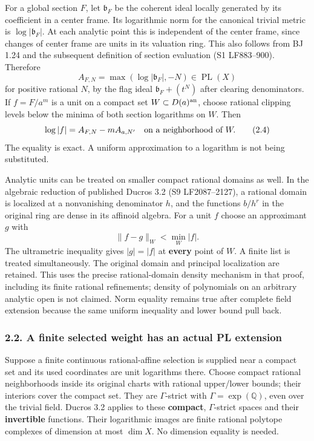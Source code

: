 \documentclass[
  10pt,
]{article}
\begin{document}
For a global section \(F\), let \(\mathfrak b_F\) be the coherent ideal
locally generated by its coefficient in a center frame. Its logarithmic
norm for the canonical trivial metric is \(\log|\mathfrak b_F|\). At
each analytic point this is independent of the center frame, since
changes of center frame are units in its valuation ring. This also
follows from BJ 1.24 and the subsequent definition of section evaluation
(S1 LF883--900). Therefore
\[A_{F,N}=\max(\log|\mathfrak b_F|,-N)\in\operatorname{PL}(X) \tag{2.3}\]
for positive rational \(N\), by the flag ideal \(\mathfrak b_F+(t^N)\)
after clearing denominators. If \(f=F/a^m\) is a unit on a compact set
\(W\subset D(a)^{\rm an}\), choose rational clipping levels below the
minima of both section logarithms on \(W\). Then
\[\log|f|=A_{F,N}-m A_{a,N'}\quad\hbox{on a neighborhood of }W. \tag{2.4}\]
The equality is exact. A uniform approximation to a logarithm is not
being substituted.

Analytic units can be treated on smaller compact rational domains as
well. In the algebraic reduction of published Ducros 3.2 (S9
LF2087--2127), a rational domain is localized at a nonvanishing
denominator \(h\), and the functions \(b/h^r\) in the original ring are
dense in its affinoid algebra. For a unit \(f\) choose an approximant
\(g\) with \[\|f-g\|_W<\min_W|f|.\] The ultrametric inequality gives
\(|g|=|f|\) at \textbf{every} point of \(W\). A finite list is treated
simultaneously. The original domain and principal localization are
retained. This uses the precise rational-domain density mechanism in
that proof, including its finite rational refinements; density of
polynomials on an arbitrary analytic open is not claimed. Norm equality
remains true after complete field extension because the same uniform
inequality and lower bound pull back.

\subsubsection{2.2. A finite selected weight has an actual PL
extension}\label{a-finite-selected-weight-has-an-actual-pl-extension}

Suppose a finite continuous rational-affine selection is supplied near a
compact set and its used coordinates are unit logarithms there. Choose
compact rational neighborhoods inside its original charts with rational
upper/lower bounds; their interiors cover the compact set. They are
\(\Gamma\)-strict with \(\Gamma=\exp(\mathbb Q)\), even over the trivial
field. Ducros 3.2 applies to these \textbf{compact}, \(\Gamma\)-strict
spaces and their \textbf{invertible} functions. Their logarithmic images
are finite rational polytope complexes of dimension at most \(\dim X\).
No dimension equality is needed.
\end{document}
